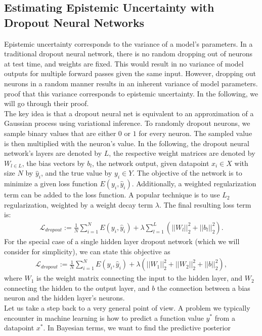 \documentclass[a4paper,cleardoubleempty,BCOR1cm, 11pt]{report}
\begin{document}
\subsection{Estimating Epistemic Uncertainty with Dropout Neural Networks}\label{sec:dropoutuncertainty}
Epistemic uncertainty corresponds to the variance of a model's parameters.
In a traditional dropout neural network, there is no random dropping out of neurons at test time, and weights are fixed. This would result in no variance of model outputs for multiple forward passes given the same input. However, dropping out neurons in a random manner results in an inherent variance of model parameters. \citet{gal2016dropout} proof that this variance corresponds to epistemic uncertainty. In the following, we will go through their proof.\\
The key idea is that a dropout neural net is equivalent to an approximation of a Gaussian process using variational inference. To randomly dropout neurons, we sample binary values that are either $0$ or $1$ for every neuron. The sampled value is then multiplied with the neuron's value.
In the following, the dropout neural network's layers are denoted by $L$, the respective weight matrices are denoted by $W_{l \in L}$, the bias vectors by $b_l$, the network output, given datapoint $x_i \in X$ with size $N$ by $\hat{y}_i$, and the true value by $y_i \in Y$. The objective of the network is to minimize a given loss function $E(y_i, \hat{y}_i)$. Additionally, a weighted regularization term can be added to the loss function. A popular technique is to use $L_2$ regularization, weighted by a weight decay term $\lambda$. The final resulting loss term is:
\begin{align*}
\mathcal{L}_{dropout} := \frac{1}{N}\sum_{i=1}^{N}E(y_i, \hat{y}_i) + \lambda \sum_{l=1}^{L}(||W_l||^2_2 + ||b_l||^2_2).
\end{align*}
For the special case of a single hidden layer dropout network (which we will consider for simplicity), we can state this objective as
\begin{align}\label{eq:dropout}
\mathcal{L}_{dropout} := \frac{1}{N}\sum_{i=1}^{N}E(y_i, \hat{y}_i) + \lambda (||W_1||^2_2 + ||W_2||^2_2+ ||b||^2_2),
\end{align} where $W_1$ is the weight matrix connecting the input to the hidden layer, and $W_2$ connecting the hidden to the output layer, and $b$ the connection between a bias neuron and the hidden layer's neurons.\\
Let us take a step back to a very general point of view. A problem we typically encounter in machine learning is how to predict a function value $y^*$ from a datapoint $x^*$. In Bayesian terms, we want to find the predictive posterior
\end{document}
